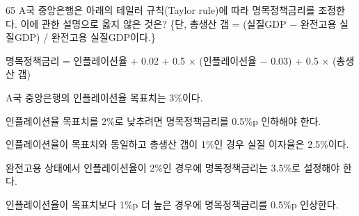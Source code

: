 \begin{question}{65}
A국 중앙은행은 아래의 테일러 규칙(Taylor rule)에 따라 명목정책금리를 조정한다. 이에 관한 설명으로 옳지 않은 것은? \{단, 총생산 갭 = (실질GDP $-$ 완전고용 실질GDP) / 완전고용 실질GDP이다.\}
\begin{framedtext}
명목정책금리 = 인플레이션율 + 0.02 + 0.5 $\times$ (인플레이션율 $-$ 0.03) + 0.5 $\times$ (총생산 갭)
\end{framedtext}
\begin{choices}
  \item A국 중앙은행의 인플레이션율 목표치는 3\%이다.
  \item 인플레이션율 목표치를 2\%로 낮추려면 명목정책금리를 0.5\%p 인하해야 한다.
  \item 인플레이션율이 목표치와 동일하고 총생산 갭이 1\%인 경우 실질 이자율은 2.5\%이다.
  \item 완전고용 상태에서 인플레이션율이 2\%인 경우에 명목정책금리는 3.5\%로 설정해야 한다.
  \item 인플레이션율이 목표치보다 1\%p 더 높은 경우에 명목정책금리를 0.5\%p 인상한다.
\end{choices}
\end{question}
